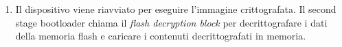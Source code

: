 \documentclass{beamer}
\begin{document}
\begin{frame}[allowframebreaks]
\begin{enumerate}
  \item Il dispositivo viene riavviato per eseguire l'immagine crittografata. Il second
    stage bootloader chiama il \textit{flash decryption block} per decrittografare i dati
    della memoria flash e caricare i contenuti decrittografati in memoria.
\end{enumerate}
\end{frame}
\end{document}
